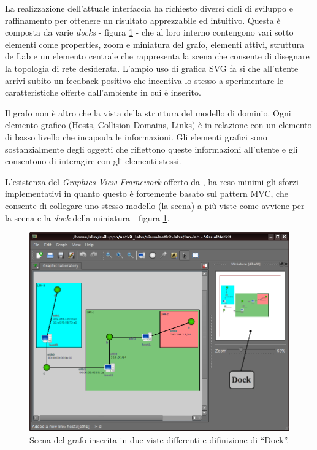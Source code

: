 La realizzazione dell'attuale interfaccia ha richiesto diversi cicli di sviluppo e raffinamento per ottenere un risultato apprezzabile ed intuitivo. Questa è composta da varie \emph{docks} - figura \ref{figura:vnetkit_graphics_view_1} - che al loro interno contengono vari sotto elementi come properties, zoom e miniatura del grafo, elementi attivi, struttura de Lab e un elemento centrale che rappresenta la scena che consente di disegnare la topologia di rete desiderata. L'ampio uso di grafica SVG fa si che all'utente arrivi subito un feedback positivo che incentiva lo stesso a sperimentare le caratteristiche offerte dall'ambiente in cui è inserito.

Il grafo non è altro che la vista della struttura del modello di dominio. Ogni elemento grafico (Hosts, Collision Domains, Links) è in relazione con un elemento di basso livello che incapsula le informazioni. Gli elementi grafici sono sostanzialmente degli oggetti che riflettono queste informazioni all'utente e gli consentono di interagire con gli elementi stessi.

L'esistenza del \emph{Graphics View Framework} offerto da \qt{}, ha reso minimi gli sforzi implementativi in quanto questo è fortemente basato sul pattern MVC, che consente di collegare uno stesso modello (la scena) a più viste come avviene per la scena e la \textit{dock} della miniatura - figura \ref{figura:vnetkit_graphics_view_1}.

\begin{figure}[!htb]
	\centering
	\includegraphics[width=12cm]{images/visualnetkit_graphics_view_1.png}
	\caption{Scena del grafo inserita in due viste differenti e difinizione di ``Dock''.}
	\label{figura:vnetkit_graphics_view_1}
\end{figure}

